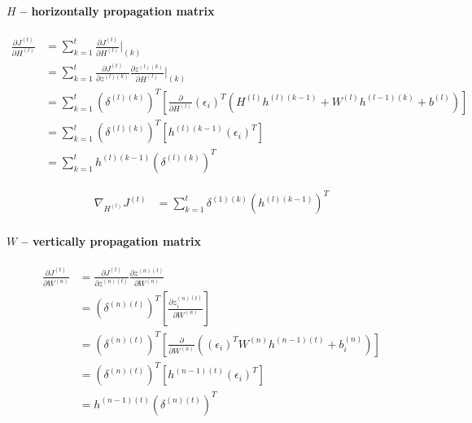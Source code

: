 \documentclass{article}
\begin{document}
	\paragraph{$H$ -- horizontally propagation matrix}
	\begin{equation}
	\begin{aligned}
		\frac{\partial J^{(t)}}{\partial H^{(l)}} 
		&= \sum_{k=1}^{t} \frac{\partial J^{(t)}}{\partial H^{(l)}}\bigg|_{(k)}  \\
		&= \sum_{k=1}^{t}
		\frac{\partial J^{(t)}}{\partial z^{(l)(k)}} 
		\frac {\partial z^{(l)(k)}}{\partial H^{(l)}}\bigg|_{(k)} \\
		&= \sum_{k=1}^{t}
		(\delta^{(l)(k)})^T \left[\frac{\partial }{\partial H^{(l)}} (\epsilon_i)^T (H^{(l)} h^{(l)(k-1)} +  W^{(l)} h^{(l-1)(k)} + b^{(l)})\right] \\
		&= \sum_{k=1}^{t}
		(\delta^{(l)(k)})^T \left[h^{(l)(k-1)} (\epsilon_i)^T\right]\\	
		&= \sum_{k=1}^{t} h^{(l)(k-1)} (\delta^{(l)(k)})^T
	\end{aligned}
	\end{equation}
	
	\begin{equation}
	\begin{aligned}
		\nabla_{H^{(l)}} J^{(t)} &= \sum_{k=1}^{t} \delta^{(1)(k)}  (h^{(l)(k-1)})^T
	\end{aligned}
	\end{equation}
	
	\paragraph{$W$ -- vertically propagation matrix}
	\begin{equation}
	\begin{aligned}
	\frac{\partial J^{(t)}}{\partial W^{(n)}} 
	&= \frac{\partial J^{(t)}}{\partial z^{(n)(t)}} 
	\frac{\partial z^{(n)(t)}}{\partial W^{(n)}} \\
	&= (\delta^{(n)(t)})^T \left[\frac{\partial z^{(n)(t)}_i}{\partial W^{(n)}}\right]\\
	&= (\delta^{(n)(t)})^T \left[\frac{\partial }{\partial W^{(n)}} ((\epsilon_i)^T  W^{(n)} h^{(n-1)(t)} + b^{(n)}_i)\right]\\
	&= (\delta^{(n)(t)})^T \left[h^{(n-1)(t)} (\epsilon_i)^T\right]\\	
	&= h^{(n-1)(t)} (\delta^{(n)(t)})^T
	\end{aligned}
	\end{equation}
	
\end{document}
